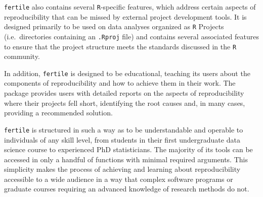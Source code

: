 \documentclass[12pt,twoside]{reedthesis}
\begin{document}
\texttt{fertile} also contains several \texttt{R}-specific features, which address certain aspects of reproducibility that can be missed by external project development tools. It is designed primarily to be used on data analyses organized as \texttt{R} Projects (i.e.~directories containing an \texttt{.Rproj} file) and contains several associated features to ensure that the project structure meets the standards discussed in the \texttt{R} community.

In addition, \texttt{fertile} is designed to be educational, teaching its users about the components of reproducibility and how to achieve them in their work. The package provides users with detailed reports on the aspects of reproducibility where their projects fell short, identifying the root causes and, in many cases, providing a recommended solution.

\texttt{fertile} is structured in such a way as to be understandable and operable to individuals of any skill level, from students in their first undergraduate data science course to experienced PhD statisticians. The majority of its tools can be accessed in only a handful of functions with minimal required arguments. This simplicity makes the process of achieving and learning about reproducibility accessible to a wide audience in a way that complex software programs or graduate courses requiring an advanced knowledge of research methods do not.
\end{document}
